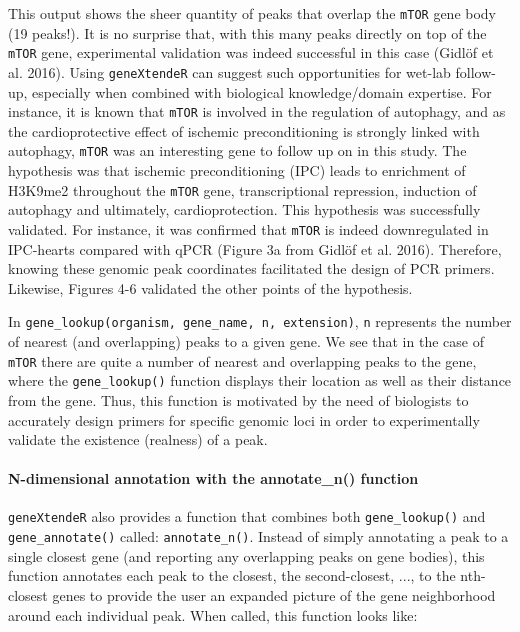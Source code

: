 \documentclass[12pt]{article}
\begin{document}
This output shows the sheer quantity of peaks that overlap the \texttt{mTOR} gene body (19 peaks!).  It is no surprise that, with this many peaks directly on top of the \texttt{mTOR} gene, experimental validation was indeed successful in this case (Gidl\"{o}f et al. 2016).  Using \texttt{geneXtendeR} can suggest such opportunities for wet-lab follow-up, especially when combined with biological knowledge/domain expertise.  For instance, it is known that \texttt{mTOR} is involved in the regulation of autophagy, and as the cardioprotective effect of ischemic preconditioning is strongly linked with autophagy, \texttt{mTOR} was an interesting gene to follow up on in this study.  The hypothesis was that ischemic preconditioning (IPC) leads to enrichment of H3K9me2 throughout the \texttt{mTOR} gene, transcriptional repression, induction of autophagy and ultimately, cardioprotection.  This hypothesis was successfully validated.  For instance, it was confirmed that \texttt{mTOR} is indeed downregulated in IPC-hearts compared with qPCR (Figure 3a from Gidl\"{o}f et al. 2016).  Therefore, knowing these genomic peak coordinates facilitated the design of PCR primers.  Likewise, Figures 4-6 validated the other points of the hypothesis.  

In \texttt{gene\_lookup(organism, gene\_name, n, extension)}, \texttt{n} represents the number of nearest (and overlapping) peaks to a given gene. We see that in the case of \texttt{mTOR} there are quite a number of nearest and overlapping peaks to the gene, where the \texttt{gene\_lookup()} function displays their location as well as their distance from the gene. Thus, this function is motivated by the need of biologists to accurately design primers for specific genomic loci in order to experimentally validate the existence (realness) of a peak.

\paragraph{N-dimensional annotation with the annotate\_n() function} \label{sec:ndim}

\texttt{geneXtendeR} also provides a function that combines both \texttt{gene\_lookup()} and \texttt{gene\_annotate()} called: \texttt{annotate\_n()}. Instead of simply annotating a peak to a single closest gene (and reporting any overlapping peaks on gene bodies), this function annotates each peak to the closest, the second-closest, ..., to the nth-closest genes to provide the user an expanded picture of the gene neighborhood around each individual peak. When called, this function looks like:
\end{document}
